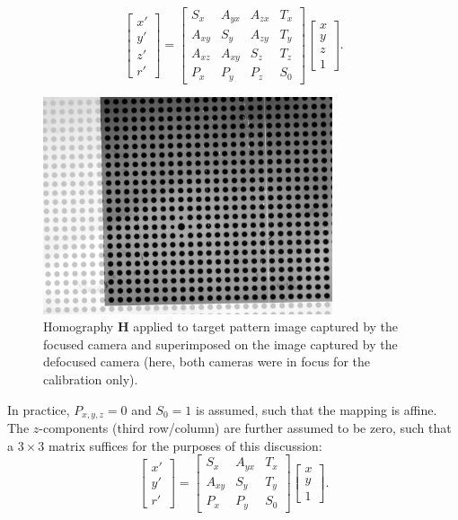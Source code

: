 \documentclass[preprint]{elsarticle}
\begin{document}
\begin{equation}
\left[\begin{array}{c} x'\\ y'\\ z'\\ r' \end{array} \right]
=
\left[ \begin{array}{cccc}
S_x & A_{yx} & A_{zx} & T_x \\
A_{xy} & S_y & A_{zy} & T_y \\
A_{xz} & A_{xy} & S_z & T_z \\
P_x & P_y & P_z & S_0
\end{array} \right]
\left[ \begin{array}{c} x\\ y \\ z \\ 1 \end{array} \right].
\end{equation}
\begin{figure}
    \centering
    \includegraphics[width=0.76\textwidth]{orb_images/plate-calibration.jpg}
    \caption{Homography $\mathbf{H}$ applied to target pattern image captured by
        the focused camera and superimposed on the image captured by the
        defocused camera (here, both cameras were in focus for the calibration
        only).
    \label{fig:plate-calibration}}
\end{figure}
In practice, $P_{x,y,z} = 0$ and $S_0 = 1$ is assumed, such that the mapping is
affine. The $z$-components (third row/column) are further assumed to be zero,
such that a $3 \times 3$ matrix suffices for the purposes of this discussion:
\begin{equation}
\left[\begin{array}{c} x'\\ y'\\ r' \end{array} \right]
=
\left[ \begin{array}{ccc}
S_x & A_{yx} &  T_x \\
A_{xy} & S_y &  T_y \\
P_x & P_y & S_0
\end{array} \right]
\left[ \begin{array}{c} x\\ y \\ 1 \end{array} \right].
\end{equation}
\end{document}
